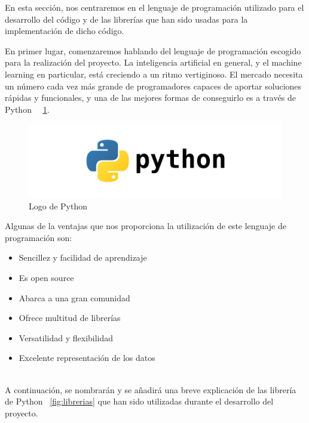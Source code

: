 \documentclass[conference,a4paper]{IEEEtran}
\begin{document}
En esta sección, nos centraremos en el lenguaje de programación utilizado para el desarrollo del código y de las librerías que han sido usadas para la implementación de dicho código.

En primer lugar, comenzaremos hablando del lenguaje de programación escogido para la realización del proyecto. La inteligencia artificial en general, y el machine learning en particular, está creciendo a un ritmo vertiginoso. El mercado necesita un número cada vez más grande de programadores capaces de aportar soluciones rápidas y funcionales, y una de las mejores formas de conseguirlo es a través de Python~\cite{b11} ~\ref{fig:python}. 

\begin{figure}
  \centering
  \includegraphics{python}
  \caption{Logo de Python}
  \label{fig:python}
\end{figure} 


\newpage
Algunas de la ventajas que nos proporciona la utilización de este lenguaje de programación son:

\begin{itemize}
\item Sencillez y facilidad de aprendizaje
\item Es open source
\item Abarca a una gran comunidad
\item Ofrece multitud de librerías
\item Versatilidad y flexibilidad
\item Excelente representación de los datos
\end{itemize}
~\cite{b11}
\\




A continuación, se nombrarán y se añadirá una breve explicación de las librería de Python ~\ref{fig:librerias} que han sido utilizadas durante el desarrollo del proyecto. 
\end{document}
